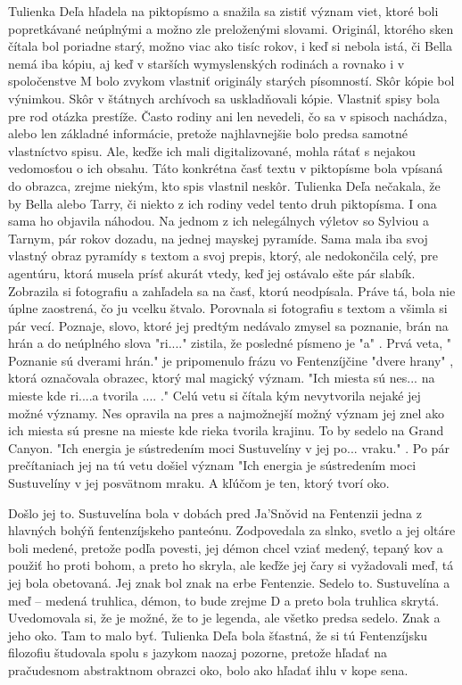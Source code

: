 \documentclass{book}
\begin{document}
Tulienka Deľa hľadela na piktopísmo a snažila sa zistiť význam viet, ktoré boli popretkávané neúplnými a možno zle preloženými slovami. Originál, ktorého sken čítala bol poriadne starý, možno viac ako tisíc rokov, i keď si nebola istá, či Bella nemá iba kópiu, aj keď v starších wymyslenských rodinách a rovnako i v spoločenstve M bolo zvykom vlastniť originály starých písomností. Skôr kópie bol výnimkou. Skôr v štátnych archívoch sa uskladňovali kópie. Vlastniť spisy bola pre rod otázka prestíže. Často rodiny ani len nevedeli, čo sa v spisoch nachádza, alebo len základné informácie, pretože najhlavnejšie bolo predsa samotné vlastníctvo spisu. Ale, keďže ich mali digitalizované, mohla rátať s nejakou vedomosťou o ich obsahu. Táto konkrétna časť textu v piktopísme bola vpísaná do obrazca, zrejme niekým, kto spis vlastnil neskôr. Tulienka Deľa nečakala, že by Bella alebo Tarry, či niekto z ich rodiny vedel tento druh piktopísma. I ona sama ho objavila náhodou. Na jednom z ich nelegálnych výletov so Sylviou a Tarnym, pár rokov dozadu, na jednej mayskej pyramíde. Sama mala iba svoj vlastný obraz pyramídy s textom a svoj prepis, ktorý, ale nedokončila celý, pre agentúru, ktorá musela prísť akurát vtedy, keď jej ostávalo ešte pár slabík. Zobrazila si fotografiu a zahľadela sa na časť, ktorú neodpísala. Práve tá, bola nie úplne zaostrená, čo ju vcelku štvalo. Porovnala si fotografiu s textom a všimla si pár vecí. Poznaje, slovo, ktoré jej predtým nedávalo zmysel sa poznanie, brán na hrán a do neúplného slova "$ $ri...."$ $  zistila, že posledné písmeno je "$ $a"$ $ . Prvá veta, "$ $Poznanie sú dverami hrán."$ $  je pripomenulo frázu vo Fentenzíjčine "$ $dvere hrany"$ $ , ktorá označovala obrazec, ktorý mal magický význam. "$ $Ich miesta sú nes... na mieste kde ri....a tvorila .... ."$ $  Celú vetu si čítala kým nevytvorila nejaké jej možné významy. Nes opravila na pres a najmožnejší možný význam jej znel ako ich miesta sú presne na mieste kde rieka tvorila krajinu. To by sedelo na Grand Canyon. "$ $Ich energia je sústredením moci Sustuvelíny v jej po... vraku."$ $ . Po pár prečítaniach jej na tú vetu došiel význam "$ $Ich energia je sústredením moci Sustuvelíny v jej posvätnom mraku. A kľúčom je ten, ktorý tvorí oko.

Došlo jej to. Sustuvelína bola v dobách pred Ja'Sno\v{}vid na Fentenzii jedna z hlavných bohýň fentenzíjskeho panteónu. Zodpovedala za slnko, svetlo a jej oltáre boli medené, pretože podľa povesti, jej démon chcel vziať medený, tepaný kov a použiť ho proti bohom, a preto ho skryla, ale keďže jej čary si vyžadovali meď, tá jej bola obetovaná. Jej znak bol znak na erbe Fentenzie. Sedelo to. Sustuvelína a meď – medená truhlica, démon, to bude zrejme D a preto bola truhlica skrytá. Uvedomovala si, že je možné, že to je legenda, ale všetko predsa sedelo. Znak a jeho oko. Tam to malo byť. Tulienka Deľa bola šťastná, že si tú Fentenzíjsku filozofiu študovala spolu s jazykom naozaj pozorne, pretože hľadať na pračudesnom abstraktnom obrazci oko, bolo ako hľadať ihlu v kope sena.
\end{document}
